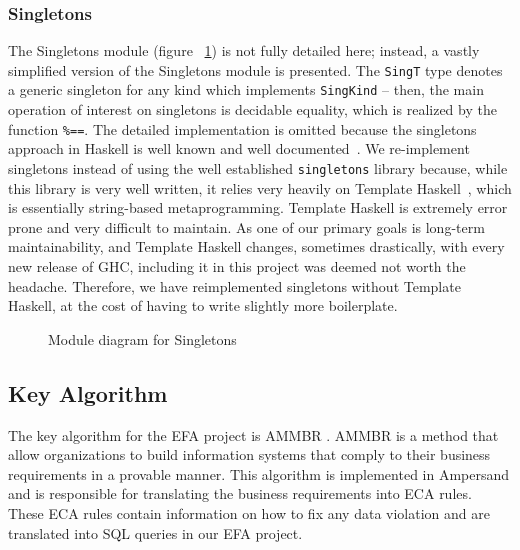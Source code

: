    
\subsubsection{Singletons}\label{subsec:Singletons}

The Singletons module (figure ~\ref{fig:singletons}) is 
not fully detailed here;
instead, a vastly simplified version of the Singletons 
module is presented. The
\lstinline{SingT} type denotes a generic singleton for 
any kind which implements
\lstinline{SingKind} -- then, the main operation of 
interest on singletons is
decidable equality, which is realized by the function 
\lstinline{%==}. The
    detailed implementation is omitted because the 
    singletons approach in Haskell
    is well known and well 
    documented~\cite{singletons}. We re-implement
    singletons instead of using the well established 
    \texttt{singletons} library
    because, while this library is very well written, 
    it relies very heavily on
    Template Haskell~\cite{th}, which is essentially 
    string-based
    metaprogramming. Template Haskell is extremely 
    error prone and very difficult
    to maintain. As one of our primary goals is 
    long-term maintainability, and
    Template Haskell changes, sometimes drastically, 
    with every new release of
    GHC, including it in this project was deemed not 
    worth the
    headache. Therefore, we have reimplemented 
    singletons without Template
    Haskell, at the cost of having to write slightly 
    more boilerplate.


\begin{figure}[!ht]
    \caption{Module diagram for Singletons} \label{fig:singletons}
\end{figure}

\subsection{Key Algorithm}
The key algorithm for the EFA project is AMMBR \cite{AMMBR}. AMMBR is a method 
that allow organizations to build information systems that comply to their 
business requirements in a provable manner. This algorithm is implemented in 
Ampersand and is responsible for translating the business requirements into ECA 
rules. These ECA rules contain information on how to fix any data violation and 
are translated into SQL queries in our EFA project.

